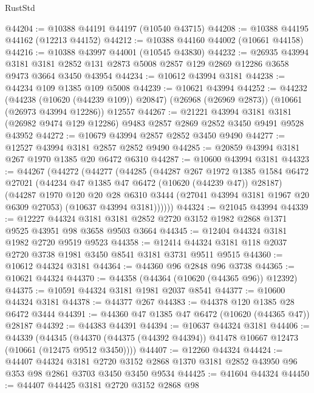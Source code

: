 \begin{lexlean}{RustStd}
\begin{coremodule}
@44204 := @10388 @44191 @44197 (@10540 @43715)
@44208 := @10388 @44195 @44162 (@12213 @44152)
@44212 := @10388 @44160 @44002 (@10661 @44158)
@44216 := @10388 @43997 @44001 (@10545 @43830)
@44232 := @26935
    @43994
    @3181
    @3181
    @2852
    @131
    @2873
    @5008
    @2857
    @129
    @2869
    @12286
    @3658
    @9473
    @3664
    @3450
    @43954
@44234 := @10612 @43994 @3181
@44238 := @44234 @109 @1385 @109 @5008
@44239 := @10621 @43994
@44252 := @44232
    (@44238 (@10620 (@44239 @109)) @20847)
    (@26968 (@26969 @2873))
    (@10661 (@26973 @43994 @12286))
    @12557
@44267 := @21221
    @43994
    @3181
    @3181
    (@26982 @9474 @129 @12286)
    @9483
    @2857
    @2869
    @2852
    @3450
    @9491
    @9528
    @43952
@44272 := @10679 @43994 @2857 @2852 @3450 @9490
@44277 := @12527 @43994 @3181 @2857 @2852 @9490
@44285 := @20859 @43994 @3181 @267 @1970 @1385 @20 @6472 @6310
@44287 := @10600 @43994 @3181
@44323 := @44267
    (@44272
      (@44277
        (@44285
          (@44287
            @267
            @1972
            @1385
            @1584
            @6472
            @27021
            (@44234 @47 @1385 @47 @6472 (@10620 (@44239 @47)) @28187)
            (@44287
              @1970
              @120
              @20
              @28
              @6310
              @3444
              (@27041 @43994 @3181 @1967 @20 @6309 @27053)
              (@10637 @43994 @3181))))))
@44324 := @21045 @43994
@44339 := @12227
    @44324
    @3181
    @3181
    @2852
    @2720
    @3152
    @1982
    @2868
    @1371
    @9525
    @43951
    @98
    @3658
    @9503
    @3664
@44345 := @12404 @44324 @3181 @1982 @2720 @9519 @9523
@44358 := @12414 @44324 @3181 @118 @2037 @2720 @3738 @1981 @3450 @8541 @3181 @3731 @9511 @9515
@44360 := @10612 @44324 @3181
@44364 := @44360 @96 @2848 @96 @3738
@44365 := @10621 @44324
@44370 := @44358 (@44364 (@10620 (@44365 @96)) @12392)
@44375 := @10591 @44324 @3181 @1981 @2037 @8541
@44377 := @10600 @44324 @3181
@44378 := @44377 @267
@44383 := @44378 @120 @1385 @28 @6472 @3444
@44391 := @44360 @47 @1385 @47 @6472 (@10620 (@44365 @47)) @28187
@44392 := @44383 @44391
@44394 := @10637 @44324 @3181
@44406 := @44339
    (@44345 (@44370 (@44375 (@44392 @44394)) @41478 @10667 @12473 (@10661 (@12475 @9512 @3450))))
@44407 := @12260 @44324
@44424 := @44407
    @44324
    @3181
    @2720
    @3152
    @2868
    @1370
    @3181
    @2852
    @43950
    @96
    @353
    @98
    @2861
    @3703
    @3450
    @3450
    @9534
@44425 := @41604 @44324
@44450 := @44407
    @44425
    @3181
    @2720
    @3152
    @2868
    @98

\end{coremodule}
\end{lexlean}

